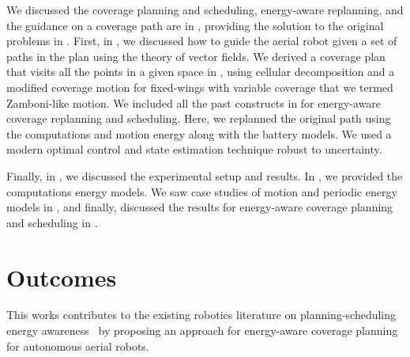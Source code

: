 We discussed the coverage planning and scheduling, energy-aware replanning, and the guidance on a coverage path are in , providing the solution to the original problems in . First, in , we discussed how to guide the aerial robot given a set of paths in the plan using the theory of vector fields. We derived a coverage plan that visits all the points in a given space in , using cellular decomposition and a modified coverage motion for fixed-wings with variable coverage that we termed Zamboni-like motion. We included all the past constructs in  for energy-aware coverage replanning and scheduling. Here, we replanned the original path using the computations and motion energy along with the battery models. We used a modern optimal control and state estimation technique robust to uncertainty. 

Finally, in , we discussed the experimental setup and results. In , we provided the \powprof{} computations energy models. We saw case studies of motion and periodic energy models in , and finally, discussed the results for energy-aware coverage planning and scheduling in .


\section{Outcomes}

This works contributes to the existing robotics literature on planning-scheduling energy awareness~\citep{mei2005case,mei2006deployment,brateman2006energy,zhang2007low,sadrpour2013experimental,sadrpour2013mission,ondruska2015scheduled,lahijanian2018resource,sudhakar2020balancing} by proposing an approach for energy-aware coverage planning for autonomous aerial robots.

